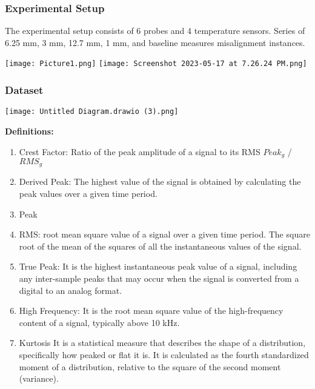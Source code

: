 \documentclass[9pt]{beamer}
\begin{document}
\begin{frame}
\frametitle{Experimental Setup}
The experimental setup consists of 6 probes and 4 temperature sensors. Series of 6.25 mm, 3 mm, 12.7 mm, 1 mm, and baseline measures misalignment instances.

\texttt{[image: Picture1.png]}
\texttt{[image: Screenshot 2023-05-17 at 7.26.24 PM.png]}
\end{frame}
\begin{frame}




\frametitle{Dataset}

\begin{center}
    

\texttt{[image: Untitled Diagram.drawio (3).png]}
\end{center}
\textbf{Definitions: }

\begin{enumerate}
    \item Crest Factor: Ratio of the peak amplitude of a signal to its RMS $Peak_g$ / $RMS_g$
    \item Derived Peak: The highest value of the signal is obtained by calculating the peak values over a given time period.
    \item Peak
    \item RMS: root mean square value of a signal over a given time period. The square root of the mean of the squares of all the instantaneous values of the signal.
    \item True Peak: It is the highest instantaneous peak value of a signal, including any inter-sample peaks that may occur when the signal is converted from a digital to an analog format.
    \item High Frequency: It is the root mean square value of the high-frequency content of a signal, typically above 10 kHz.
    \item Kurtosis It is a statistical measure that describes the shape of a distribution, specifically how peaked or flat it is. It is calculated as the fourth standardized moment of a distribution, relative to the square of the second moment (variance).


\end{enumerate}


\end{frame}
\end{document}

